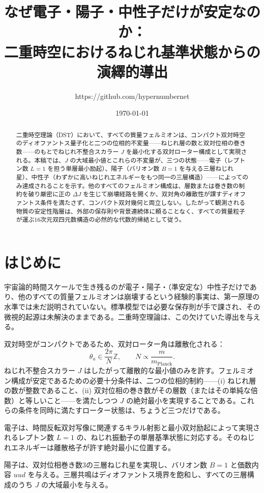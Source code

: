 \documentclass[dvipdfmx,a4paper]{article}
\title{なぜ電子・陽子・中性子だけが安定なのか：\\
二重時空におけるねじれ基準状態からの演繹的導出}
\author{https://github.com/hypernumbernet}
\date{\today}
\begin{document}
\maketitle

\begin{abstract}
二重時空理論（DST）において、すべての質量フェルミオンは、コンパクト双対時空のディオファントス量子化と二つの位相的不変量——ねじれ層の数と双対位相の巻き数——のもとでねじれ不整合スカラー \(J\) を最小化する双対ローター構成として実現される。本稿では、\(J\) の大域最小値とこれらの不変量が、三つの状態——電子（レプトン数 \(L=1\) を担う単層最小励起）、陽子（バリオン数 \(B=1\) を与える三層ねじれ星）、中性子（わずかに高いねじれエネルギーをもつ同一の三層構造）——によってのみ達成されることを示す。他のすべてのフェルミオン構成は、層数または巻き数の制約を破り厳密に正の \(\Delta J\) を生じて崩壊経路を開くか、双対角の離散性が課すディオファントス条件を満たさず、コンパクト双対幾何と両立しない。したがって観測される物質の安定性階層は、外部の保存則や背景連続体に頼ることなく、すべての質量粒子が運ぶ16次元双四元数構造の必然的な代数的帰結として従う。

\end{abstract}

\section{はじめに}

宇宙論的時間スケールで生き残るのが電子・陽子・（準安定な）中性子だけであり、他のすべての質量フェルミオンは崩壊するという経験的事実は、第一原理の水準では未だ説明されていない。標準模型では必要な保存則が手で課され、その微視的起源は未解決のままである。二重時空理論は、この欠けていた導出を与える。

双対時空がコンパクトであるため、双対ローター角は離散化される：
\[
\theta_a\in\frac{2\pi}{N}\mathbb{Z},\qquad N\propto\frac{m}{m_\text{Planck}}.
\]
ねじれ不整合スカラー \(J\) はしたがって離散的な最小値のみを許す。フェルミオン構成が安定であるための必要十分条件は、二つの位相的制約——(i) ねじれ層の数が整数であること、(ii) 双対位相の巻き数がその層数（またはその単純な倍数）と等しいこと——を満たしつつ \(J\) の絶対最小を実現することである。これらの条件を同時に満たすローター状態は、ちょうど三つだけである。

電子は、時間反転双対写像に関連するキラル射影と最小双対励起によって実現されるレプトン数 \(L=1\) の、ねじれ振動子の単層基準状態に対応する。そのねじれエネルギーは離散格子が許す絶対最小に位置する。

陽子は、双対位相巻き数3の三層ねじれ星を実現し、バリオン数 \(B=1\) と価数内容 \(uud\) を与える。三層共鳴はディオファントス境界を飽和し、すべての三層構成のうち \(J\) の大域最小を与える。
\end{document}
